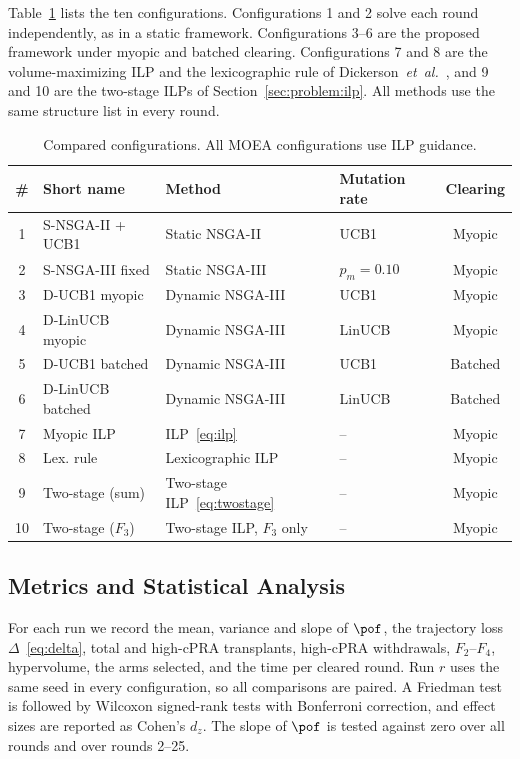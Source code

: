 \documentclass[journal]{IEEEtran}
\begin{document}
Table~\ref{tab:configs} lists the ten configurations. Configurations 1
and 2 solve each round independently, as in a static framework. Configurations 3--6 are the proposed framework under myopic
and batched clearing. Configurations 7 and 8 are the volume-maximizing
ILP and the lexicographic rule of
Dickerson~\textit{et~al.}~\cite{dickerson2014price}, and 9 and 10 are
the two-stage ILPs of Section~\ref{sec:problem:ilp}. All methods use
the same structure list in every round.

\begin{table}[!htbp]
\caption{Compared configurations. All MOEA configurations use ILP
guidance.}
\label{tab:configs}
\begin{tabular}{clllc}
\toprule
\# & Short name & Method & Mutation rate & Clearing \\
\midrule
1 & S-NSGA-II + UCB1  & Static NSGA-II   & UCB1         & Myopic \\
2 & S-NSGA-III fixed  & Static NSGA-III  & $p_m = 0.10$ & Myopic \\
3 & D-UCB1 myopic     & Dynamic NSGA-III & UCB1         & Myopic \\
4 & D-LinUCB myopic   & Dynamic NSGA-III & LinUCB       & Myopic \\
5 & D-UCB1 batched    & Dynamic NSGA-III & UCB1         & Batched \\
6 & D-LinUCB batched  & Dynamic NSGA-III & LinUCB       & Batched \\
7 & Myopic ILP        & ILP~\eqref{eq:ilp} & --         & Myopic \\
8 & Lex. rule & Lexicographic ILP~\cite{dickerson2014price} & -- & Myopic \\
9 & Two-stage (sum)   & Two-stage ILP~\eqref{eq:twostage} & --  & Myopic \\
10 & Two-stage ($F_3$) & Two-stage ILP, $F_3$ only & --      & Myopic \\
\bottomrule
\end{tabular}
\end{table}

\subsection{Metrics and Statistical Analysis}
\label{sec:exp:metrics}

For each run we record the mean, variance and slope of $\pof$, the
trajectory loss $\Delta$~\eqref{eq:delta}, total and high-cPRA
transplants, high-cPRA withdrawals, $F_2$--$F_4$, hypervolume, the arms
selected, and the time per cleared round. Run $r$ uses the same seed in
every configuration, so all comparisons are paired. A Friedman test is
followed by Wilcoxon signed-rank tests with Bonferroni correction, and
effect sizes are reported as Cohen's $d_z$. The slope of $\pof$ is
tested against zero over all rounds and over rounds 2--25.
\end{document}

